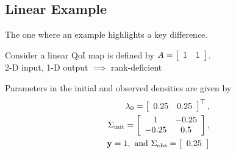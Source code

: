 

\subsection{Linear Example}

\begin{frame}[t]{The one where an example highlights a key difference.}

\centering
Consider a linear QoI map is defined by $A=\mat{cc}{1 & 1}$. \\
2-D input, 1-D output $\implies$ rank-deficient

\vskip 12pt

Parameters in the initial and observed densities are given by
\begin{equation*}
\begin{split}
	\initialMean = \mat{cc}{0.25 & 0.25}^\top, \\
  \initialCov = \mat{cc}{1 & -0.25 \\ -0.25 & 0.5}, \\
  \observedMean=1, \text{ and } \observedCov = \mat{c}{0.25}
\end{split}
\end{equation*}

\end{frame}

